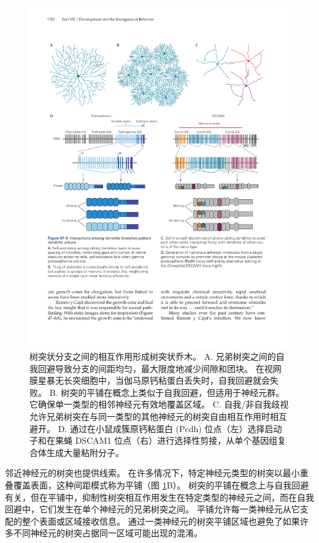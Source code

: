 \begin{figure}[htbp]
	\centering
	\includegraphics[width=0.95\linewidth]{chap47/fig_47_5}
	\caption{树突状分支之间的相互作用形成树突状乔木。 A. 兄弟树突之间的自我回避导致分支的间距均匀，最大限度地减少间隙和团块。 在视网膜星暴无长突细胞中，当伽马原钙粘蛋白丢失时，自我回避就会失败。 B. 树突的平铺在概念上类似于自我回避，但适用于神经元群。 它确保单一类型的相邻神经元有效地覆盖区域。 C. 自我/非自我歧视允许兄弟树突在与同一类型的其他神经元的树突自由相互作用时相互避开。 D. 通过在小鼠成簇原钙粘蛋白 (Pcdh) 位点（左）选择启动子和在果蝇 DSCAM1 位点（右）进行选择性剪接，从单个基因组复合体生成大量粘附分子。}
	\label{fig:47_5}
\end{figure}


邻近神经元的树突也提供线索。
在许多情况下，特定神经元类型的树突以最小重叠覆盖表面，这种间距模式称为平铺（图 \ref{fig:47_5}B）。
树突的平铺在概念上与自我回避有关，但在平铺中，抑制性树突相互作用发生在特定类型的神经元之间，而在自我回避中，它们发生在单个神经元的兄弟树突之间。
平铺允许每一类神经元从它支配的整个表面或区域接收信息。
通过一类神经元的树突平铺区域也避免了如果许多不同神经元的树突占据同一区域可能出现的混淆。


